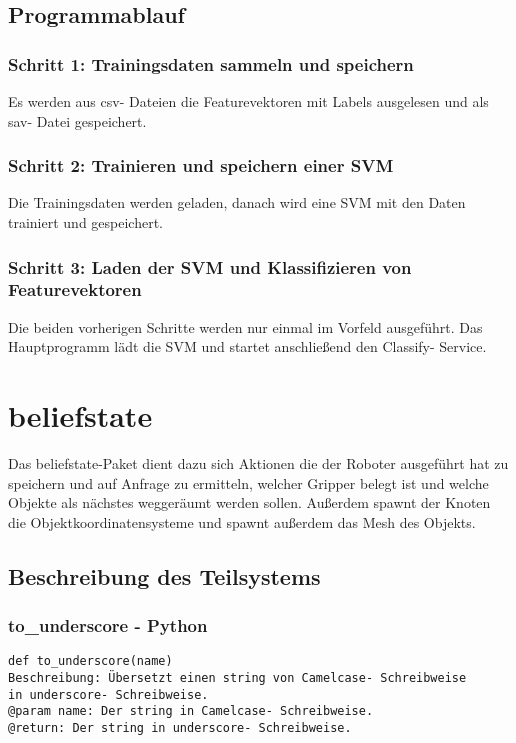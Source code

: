 \documentclass{suturo}
\begin{document}
\subsection{Programmablauf}
\subsubsection{Schritt 1: Trainingsdaten sammeln und speichern}
Es werden aus csv- Dateien die Featurevektoren mit Labels ausgelesen und als sav- Datei gespeichert.

\subsubsection{Schritt 2: Trainieren und speichern einer SVM} 
Die Trainingsdaten werden geladen, danach wird eine SVM mit den Daten trainiert und gespeichert.

\subsubsection{Schritt 3: Laden der SVM und Klassifizieren von Featurevektoren}
Die beiden vorherigen Schritte werden nur einmal im Vorfeld ausgeführt. Das Hauptprogramm lädt die SVM und startet anschließend den Classify- Service.

\section{beliefstate}
Das beliefstate-Paket dient dazu sich Aktionen die der Roboter ausgeführt hat zu speichern und auf Anfrage zu ermitteln, welcher Gripper belegt ist und welche Objekte als nächstes weggeräumt werden sollen. Außerdem spawnt der Knoten die Objektkoordinatensysteme und spawnt außerdem das Mesh des Objekts.

\begin{figure}[!htb]
\end{figure}
      
\subsection{Beschreibung des Teilsystems}

\subsubsection{to\_underscore - Python}
\begin{verbatim}
def to_underscore(name)
Beschreibung: Übersetzt einen string von Camelcase- Schreibweise 
in underscore- Schreibweise. 
@param name: Der string in Camelcase- Schreibweise.
@return: Der string in underscore- Schreibweise.
\end{verbatim}
\end{document}

